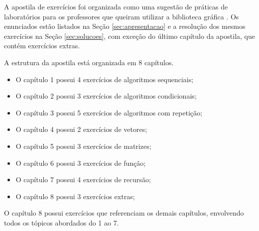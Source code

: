\label{appendix:apostila}
%
A apostila de exercícios foi organizada como uma sugestão de práticas de laboratórios para os professores que queiram utilizar a biblioteca gráfica \playAPC{}. Os enunciados estão listados na Seção \ref{sec:apresentacao} e a resolução dos mesmos exercícios na Seção \ref{sec:solucoes}, com exceção do último capítulo da apostila, que contém exercícios extras. 

A estrutura da apostila está organizada em 8 capítulos.
\begin{itemize}
	\item O capítulo 1 possui 4 exercícios de algoritmos sequenciais;
	\item O capítulo 2 possui 3 exercícios de algoritmos condicionais;
	\item O capítulo 3 possui 5 exercícios de algoritmos com repetição;
	\item O capítulo 4 possui 2 exercícios de vetores;
	\item O capítulo 5 possui 3 exercícios de matrizes;
	\item O capítulo 6 possui 3 exercícios de função;
	\item O capítulo 7 possui 4 exercícios de recursão;
	\item O capítulo 8 possui 3 exercícios extras;
\end{itemize}

O capítulo 8 possui exercícios que referenciam os demais capítulos, envolvendo todos os tópicos abordados do 1 ao 7.
